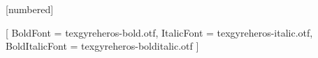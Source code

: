 [numbered]

\usepackage{amsmath,booktabs,siunitx,tikz}
\usetikzlibrary{positioning,arrows.meta}

\setsansfont{texgyreheros-regular.otf}[
  BoldFont = texgyreheros-bold.otf,
  ItalicFont = texgyreheros-italic.otf,
  BoldItalicFont = texgyreheros-bolditalic.otf
]
